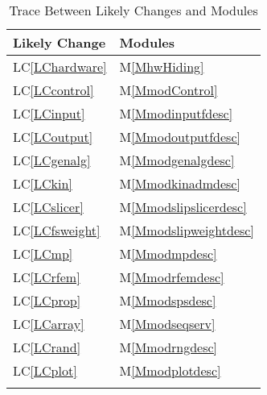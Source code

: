 \documentclass[12pt]{article}
\begin{document}
\begin{longtable}{l l}
\toprule
Likely Change & Modules
\\
\midrule
LC\ref{LChardware} & M\ref{MhwHiding}
\\
LC\ref{LCcontrol} & M\ref{MmodControl}
\\
LC\ref{LCinput} & M\ref{Mmodinputfdesc}
\\
LC\ref{LCoutput} & M\ref{Mmodoutputfdesc}
\\
LC\ref{LCgenalg} & M\ref{Mmodgenalgdesc}
\\
LC\ref{LCkin} & M\ref{Mmodkinadmdesc}
\\
LC\ref{LCslicer} & M\ref{Mmodslipslicerdesc}
\\
LC\ref{LCfsweight} & M\ref{Mmodslipweightdesc}
\\
LC\ref{LCmp} & M\ref{Mmodmpdesc}
\\
LC\ref{LCrfem} & M\ref{Mmodrfemdesc}
\\
LC\ref{LCprop} & M\ref{Mmodspsdesc}
\\
LC\ref{LCarray} & M\ref{Mmodseqserv}
\\
LC\ref{LCrand} & M\ref{Mmodrngdesc}
\\
LC\ref{LCplot} & M\ref{Mmodplotdesc}
\\
\bottomrule
\caption{Trace Between Likely Changes and Modules}
\label{Table:TBLCaM}
\end{longtable}
\end{document}
